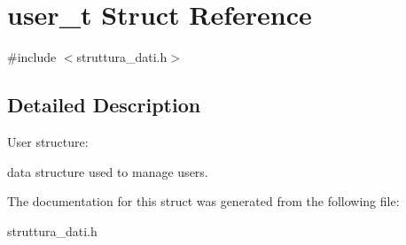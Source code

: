\hypertarget{structuser__t}{}\section{user\+\_\+t Struct Reference}
\label{structuser__t}


{\ttfamily \#include $<$struttura\+\_\+dati.\+h$>$}



\subsection{Detailed Description}
User structure\+:

data structure used to manage users. 

The documentation for this struct was generated from the following file\+:\begin{DoxyCompactItemize}
\item 
struttura\+\_\+dati.\+h\end{DoxyCompactItemize}
